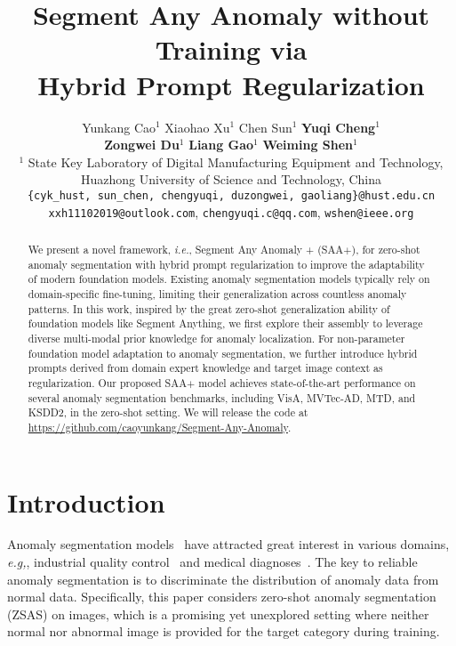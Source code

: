 \documentclass{article}
\title{Segment Any Anomaly without Training via \\  Hybrid Prompt Regularization}
\author{
  Yunkang Cao$^{1}$\footnotemark[1]\quad 
  Xiaohao Xu$^{1}$\footnotemark[1]\quad 
  Chen Sun$^{1}$ \quad 
  \textbf{Yuqi Cheng}$^{1}$ \\
  \textbf{Zongwei Du}$^{1}$ \quad
  \textbf{Liang Gao}$^{1}$  \quad
  \textbf{Weiming Shen$^{1}$\footnotemark[4]} 
  \\
$^1$ State Key Laboratory of Digital Manufacturing 
Equipment and Technology,\\ Huazhong University of Science and Technology, China\\
  \texttt{\{cyk\_hust, sun\_chen, chengyuqi, duzongwei, gaoliang\}@hust.edu.cn}  \\  \texttt{xxh11102019@outlook.com}, \texttt{chengyuqi.c@qq.com},  \texttt{wshen@ieee.org} \\
}
\begin{document}
\maketitle

\renewcommand{\thefootnote}{\fnsymbol{footnote}}

\renewcommand{\thefootnote}{\arabic{footnote}}

\begin{abstract}
We present a novel framework, \textit{i.e.}, Segment Any Anomaly + (SAA$+$), for zero-shot anomaly segmentation with hybrid prompt regularization to improve the adaptability of modern foundation models. Existing anomaly segmentation models typically rely on domain-specific fine-tuning, limiting their generalization across countless anomaly patterns. In this work, inspired by the great zero-shot generalization ability of foundation models like Segment Anything, we first explore their assembly to leverage diverse multi-modal prior knowledge for anomaly localization. For non-parameter foundation model adaptation to anomaly segmentation, we further introduce hybrid prompts derived from domain expert knowledge and target image context as regularization. Our proposed SAA$+$ model achieves state-of-the-art performance on several anomaly segmentation benchmarks, including VisA, MVTec-AD, MTD, and KSDD2, in the zero-shot setting. We will release the code at \href{https://github.com/caoyunkang/Segment-Any-Anomaly}{https://github.com/caoyunkang/Segment-Any-Anomaly}.





\end{abstract}


\section{Introduction}
\label{sec:intro}
 Anomaly segmentation models~\cite{cao_collaborative_2023, wan_industrial_2022, roth2022towards} have attracted great interest in various domains, \textit{e.g,}, industrial quality control~\cite{bergmann2019mvtec, bergmann2020uninformed} and medical diagnoses~\cite{baur_autoencoders_2021}. The key to reliable anomaly segmentation is to discriminate the distribution of anomaly data from normal data. Specifically, this paper considers zero-shot anomaly segmentation (ZSAS) on images, which is a promising yet unexplored setting where neither normal nor abnormal image is provided for the target category during  training.
\end{document}
